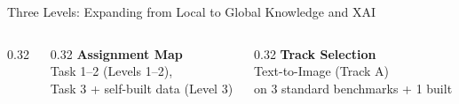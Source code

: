 \documentclass[aspectratio=169,10pt]{beamer}
\begin{document}
\begin{frame}{Three Levels: Expanding from Local to Global Knowledge and XAI}
\begin{columns}[t]
\begin{column}{0.32\textwidth}
    \end{column}
    \begin{column}{0.32\textwidth}\centering\footnotesize
      \textbf{Assignment Map}\\Task 1--2 (Levels 1--2),\\Task 3 + self-built data (Level 3)
    \end{column}
    \begin{column}{0.32\textwidth}\centering\footnotesize
      \textbf{Track Selection}\\Text-to-Image (Track A)\\on 3 standard benchmarks + 1 built
    \end{column}
  \end{columns}
\end{frame}
\end{document}
